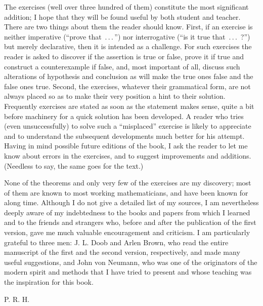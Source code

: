 The exercises (well over three hundred of them) constitute the most significant
addition; I hope that they will be found useful by both student and teacher.
There are two things about them the reader should know. First, if an exercise is
neither imperative (``prove that \,.\,.\,.\,'') nor interrogative (``is it true
that \,.\,.\,.\, ?'') but merely declarative, then it is intended as a
challenge. For such exercises the reader is asked to discover if the assertion
is true or false, prove it if true and construct a counterexample if false, and,
most important of all, discuss such alterations of hypothesis and conclusion as
will make the true ones false and the false ones true. Second, the exercises,
whatever their grammatical form, are not always placed so as to make their very
position a hint to their solution. Frequently exercises are stated as soon as
the statement makes sense, quite a bit before machinery for a quick solution has
been developed. A reader who tries (even unsuccessfully) to solve such a
``misplaced'' exercise is likely to appreciate and to understand the subsequent
developments much better for his attempt. Having in mind possible future
editions of the book, I ask the reader to let me know about errors in the
exercises, and to suggest improvements and additions. (Needless to say, the same
goes for the text.)

None of the theorems and only very few of the exercises are my discovery; most
of them are known to most working mathematicians, and have been known for along
time. Although I do not give a detailed list of my sources, I am nevertheless
deeply aware of my indebtedness to the books and papers from which I learned and
to the friends and strangers who, before and after the publication of the first
version, gave me much valuable encouragement and criticism. I am particularly
grateful to three men: J. L. Doob and Arlen Brown, who read the entire
manuscript of the first and the second version, respectively, and made many
useful suggestions, and John von Neumann, who was one of the originators of the
modern spirit and methods that I have tried to present and whose teaching was
the inspiration for this book.

\begin{flushright}
    P. R. H.
\end{flushright}